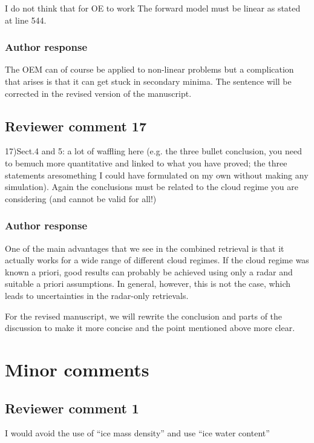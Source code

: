 \documentclass[11pt]{scrartcl}
\begin{document}
I do not think that for OE to work The forward model must be linear as stated at line 544.

\subsubsection*{Author response}

The OEM can of course be applied to non-linear problems but a complication that
arises is that it can get stuck in secondary minima. The sentence will be
corrected in the revised version of the manuscript.

\subsection*{Reviewer comment 17}

17)Sect.4 and 5: a lot of waffling here (e.g. the three bullet conclusion, you
need to bemuch more quantitative and linked to what you have proved; the three
statements aresomething I could have formulated on my own without making any
simulation). Again the conclusions must be related to the cloud regime you are
considering (and cannot be valid for all!)

\subsubsection*{Author response}

One of the main advantages that we see in the combined retrieval is that it
actually works for a wide range of different cloud regimes. If the cloud regime
was known a priori, good results can probably be achieved using only a radar and
suitable a priori assumptions. In general, however, this is not the case, which
leads to uncertainties in the radar-only retrievals.

For the revised manuscript, we will rewrite the conclusion and parts of the discussion to make
it more concise and the point mentioned above more clear.

\section{Minor comments}

\subsection*{Reviewer comment 1}
I would avoid the use of “ice mass density” and use “ice water content”
\end{document}
